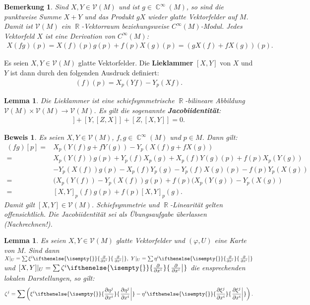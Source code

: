 \documentclass[paper=A4, twoside, chapterprefix=true, bibliography=totoc, headsepline]{scrbook}
\let\temp\phi{}
\let\phi\varphi{}
\let\varphi\temp{}
\let\temp\theta{}
\let\theta\vartheta{}
\let\vartheta\temp{}
\let\temp\epsilon{}
\let\epsilon\varepsilon{}
\let\varepsilon\temp{}
\let\temp\rho{}
\let\rho\varrho{}
\let\varrho\temp{}
\DeclareMathOperator{\C}{\mathbb{C}}
\DeclareMathOperator{\R}{\mathbb{R}}
\newcommand{\pdifffrac}[3][]{\ifthenelse{\isempty{#1}}{\frac{\partial #2}{\partial #3}}{\left. \frac{\partial #2}{\partial #3} \right|_{#1}}}
\theoremstyle{plain}
\newtheorem{Lemma}[Dfn]{Lemma}
\theoremstyle{nonumberplain}
\newtheorem{bem}{Bemerkung}
\newtheorem{bew}{Beweis}
\theoremstyle{empty}
\theoremstyle{break}
\newcommand{\CmIndex}[2][]{\ifthenelse{\isempty{#1}}{\index{#2}}{\index{#1}}#2}
\newcommand{\CmMark}[2][]{\textbf{\CmIndex[#1]{#2}}}
\begin{document}
\begin{bem}
  Sind $X,Y \in \mathcal V(M)$ und ist $g \in \C^{\infty}(M)$, so sind die punktweise Summe $X+Y$ und das Produkt $gX$ wieder glatte Vektorfelder auf $M$. Damit ist $\mathcal V(M)$ ein $\R$-Vektorraum beziehungsweise $C^{\infty}(M)$-Modul.
  Jedes Vektorfeld $X$ ist eine Derivation von $C^{\infty}(M)$:
  \begin{align*}
    X(fg)(p) = X(f)(p)g(p) + f(p) X(g)(p) = \left(gX(f) + fX(g)\right)(p).
  \end{align*}
\end{bem}

Es seien $X,Y \in \mathcal V(M)$ glatte Vektorfelder. Die \CmMark{Lieklammer} $[X,Y]$ von $X$ und $Y$ ist dann durch den folgenden Ausdruck definiert:
\begin{align*}
  [X,Y](f)(p) = X_p(Yf)-Y_p(Xf).
\end{align*}

\begin{Lemma}
  Die Lieklammer ist eine schiefsymmetrische $\R$-bilineare Abbildung $\mathcal V(M) \times \mathcal V(M) \to \mathcal V(M)$. Es gilt die sogenannte \CmMark{Jacobiidentit\"at}:
  \begin{align*}
    [X,[Y,Z]] + [Y,[Z,X]] + [Z,[X,Y]] = 0.
  \end{align*}
\end{Lemma}

\begin{bew}
  Es seien $X,Y \in \mathcal V(M)$, $f,g \in \C^{\infty}(M)$ und $p \in M$. Dann gilt:
  \begin{align*}
    [X,Y](fg)[p]  ={} & X_p(Y(f)g + fY(g)) - Y_p(X(f)g+fX(g))\\
    ={} & X_p(Y(f))g(p) + Y_p(f)X_p(g) + X_p(f)Y(g)(p) + f(p)X_p(Y(g))\\
    & - Y_p(X(f))g(p) - X_p(f)Y_p(g) - Y_p(f)X(g)(p) - f(p)Y_p(X(g))\\
    ={} & (X_p(Y(f))-Y_p(X(f))g(p) + f(p)(X_p(Y(g))-Y_p(X(g))\\
    ={} & [X,Y]_p (f)g(p) + f(p)[X,Y]_p(g).
  \end{align*}
  Damit gilt $[X,Y] \in \mathcal V(M)$. Schiefsymmetrie und $\R$-Linearit\"at gelten offensichtlich. Die Jacobiidentit\"at sei als \"Ubungsaufgabe \"uberlassen (Nachrechnen!).
\end{bew}


\begin{Lemma}
  Es seien $X,Y \in \mathcal V(M)$ glatte Vektorfelder und $(\phi,U)$ eine Karte von $M$.
  Sind dann $X|_U = \sum \xi^i\pdifffrac{}{x^i}, \ Y|_U = \sum \eta^i \pdifffrac{}{x^i}$ und $[X,Y]|_U = \sum \zeta^i \pdifffrac{}{x^i}$ die ensprechenden lokalen Darstellungen, so gilt:
  \begin{align*}
    \zeta^j = \sum \left(\xi^i\pdifffrac{\eta^j}{x^i} - \eta^i \pdifffrac{\xi^j}{x^i} \right).
  \end{align*}
\end{Lemma} 
\end{document}
